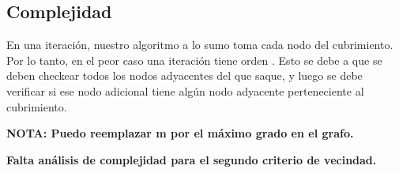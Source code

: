 \subsection{Complejidad}

En una iteración, nuestro algoritmo a lo sumo toma cada nodo del cubrimiento. Por lo tanto, en el peor caso una iteración tiene orden . Esto se debe a que se deben checkear todos los nodos adyacentes del que saque, y luego se debe verificar si ese nodo adicional tiene algún nodo adyacente perteneciente al cubrimiento. 

\textbf{NOTA: Puedo reemplazar m por el máximo grado en el grafo.}

\textbf{Falta análisis de complejidad para el segundo criterio de vecindad.}

